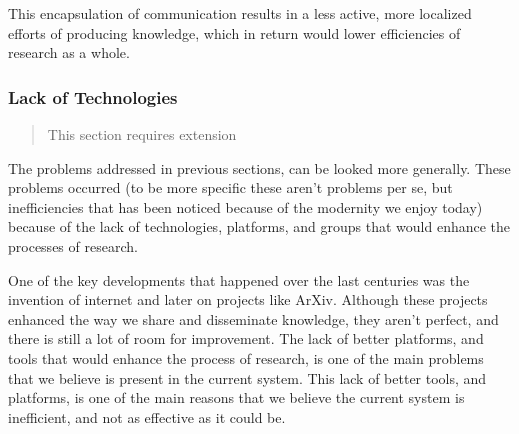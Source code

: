 This encapsulation of communication results in a less active, more localized efforts of producing knowledge, which in return would lower efficiencies of research as a whole.

\subsubsection{Lack of Technologies}\label{subsubsec:lack-of-technologies}
\begin{quotation}
    This section requires extension
\end{quotation}

The problems addressed in previous sections, can be looked more generally.
These problems occurred (to be more specific these aren't problems per se, but inefficiencies that has been noticed because of the modernity we enjoy today) because of the lack of technologies, platforms, and groups that would enhance the processes of research.

One of the key developments that happened over the last centuries was the invention of internet and later on projects like ArXiv.
Although these projects enhanced the way we share and disseminate knowledge, they aren't perfect, and there is still a lot of room for improvement.
The lack of better platforms, and tools that would enhance the process of research, is one of the main problems that we believe is present in the current system.
This lack of better tools, and platforms, is one of the main reasons that we believe the current system is inefficient, and not as effective as it could be.